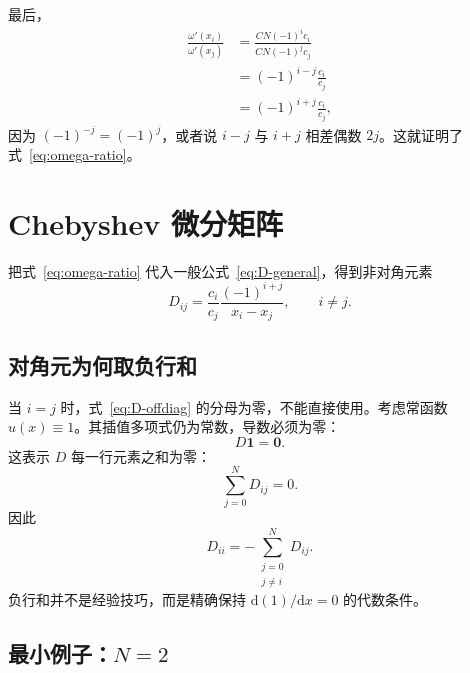 \documentclass[11pt,a4paper]{ctexart}
\numberwithin{equation}{section}
\newcommand{\vect}[1]{\bm{#1}}
\begin{document}
最后，
\begin{align}
  \frac{\omega'(x_i)}{\omega'(x_j)}
  &=\frac{CN(-1)^ic_i}{CN(-1)^jc_j}\\
  &=(-1)^{i-j}\frac{c_i}{c_j}\\
  &=(-1)^{i+j}\frac{c_i}{c_j},
\end{align}
因为 $(-1)^{-j}=(-1)^j$，或者说 $i-j$ 与 $i+j$ 相差偶数 $2j$。这就证明了式~\eqref{eq:omega-ratio}。

\section{Chebyshev 微分矩阵}

把式~\eqref{eq:omega-ratio} 代入一般公式~\eqref{eq:D-general}，得到非对角元素
\begin{equation}
  \boxed{
  D_{ij}=\frac{c_i}{c_j}
  \frac{(-1)^{i+j}}{x_i-x_j}},
  \qquad i\ne j.
  \label{eq:D-offdiag}
\end{equation}

\subsection{对角元为何取负行和}

当 $i=j$ 时，式~\eqref{eq:D-offdiag} 的分母为零，不能直接使用。考虑常函数 $u(x)\equiv1$。其插值多项式仍为常数，导数必须为零：
\begin{equation}
  D\vect{1}=\vect{0}.
\end{equation}
这表示 $D$ 每一行元素之和为零：
\begin{equation}
  \sum_{j=0}^N D_{ij}=0.
\end{equation}
因此
\begin{equation}
  \boxed{D_{ii}=-\sum_{\substack{j=0\\j\ne i}}^N D_{ij}}.
  \label{eq:D-diagonal}
\end{equation}
负行和并不是经验技巧，而是精确保持 $\mathrm d(1)/\mathrm dx=0$ 的代数条件。

\subsection{最小例子：$N=2$}
\end{document}
